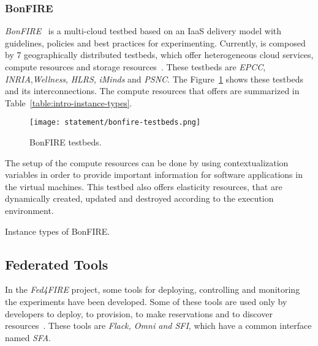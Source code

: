 \subsubsection{BonFIRE}

\emph{BonFIRE}~\cite{Hume2012} is a multi-cloud testbed based on an \ac{IaaS}
delivery model with guidelines, policies and best practices for
experimenting. Currently, \bonfire is composed by 7 geographically distributed
testbeds, which offer heterogeneous cloud services, compute resources and
storage resources~\cite{BonFIRE2014}. These testbeds are \emph{EPCC},\emph{
  INRIA},\emph{Wellness},\emph{ HLRS}, \emph{iMinds} and \emph{PSNC}. The
Figure~\ref{fig:intr-bonfire-testbeds} shows these testbeds and its
interconnections. The compute resources that \bonfire offers are summarized in Table~\ref{table:intro-instance-types}.


\begin{figure}[!h]
\begin{center}
\texttt{[image: statement/bonfire-testbeds.png]}
\caption{BonFIRE testbeds.}
\label{fig:intr-bonfire-testbeds}
\end{center}
\end{figure}

The setup of the compute resources can be done by using contextualization variables in
order to provide important information for software applications in the virtual
machines.
This testbed also offers elasticity resources, that are dynamically created,
updated and destroyed according to the execution environment.

\begin{table}[H]
  \centering
  {\small
  
  }
  \caption{Instance types of BonFIRE.}
  \label{table:intro-instance-types}
\end{table}


\subsection{Federated Tools}
\label{subsec:federatedtools}
In the \emph{Fed4FIRE} project, some tools for deploying, controlling and
monitoring the experiments have been developed.
Some of these tools are used only by developers to deploy, to provision, to
make reservations and to discover resources~\cite{Fed4FIRE2014}. These tools are \emph{Flack, Omni
  and SFI}, which have a common interface named \emph{SFA}.

